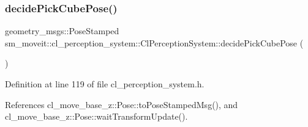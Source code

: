 \subsubsection{\texorpdfstring{decide\+Pick\+Cube\+Pose()}{decidePickCubePose()}}
{\footnotesize\ttfamily geometry\+\_\+msgs\+::\+Pose\+Stamped sm\+\_\+moveit\+::cl\+\_\+perception\+\_\+system\+::\+Cl\+Perception\+System\+::decide\+Pick\+Cube\+Pose (\begin{DoxyParamCaption}{ }\end{DoxyParamCaption})\hspace{0.3cm}{\ttfamily [inline]}}



Definition at line 119 of file cl\+\_\+perception\+\_\+system.\+h.



References cl\+\_\+move\+\_\+base\+\_\+z\+::\+Pose\+::to\+Pose\+Stamped\+Msg(), and cl\+\_\+move\+\_\+base\+\_\+z\+::\+Pose\+::wait\+Transform\+Update().


